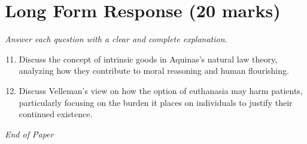 \documentclass[12pt]{article}
\begin{document}
\section*{Long Form Response (20 marks)}
\textit{Answer each question with a clear and complete explanation.}
\begin{enumerate}[label=\arabic*.]
\setcounter{enumi}{10}
\item Discuss the concept of intrinsic goods in Aquinas's natural law theory, analyzing how they contribute to moral reasoning and human flourishing.
\item Discuss Velleman's view on how the option of euthanasia may harm patients, particularly focusing on the burden it places on individuals to justify their continued existence.
\end{enumerate}

\vfill
\noindent\textit{End of Paper}
\end{document}
